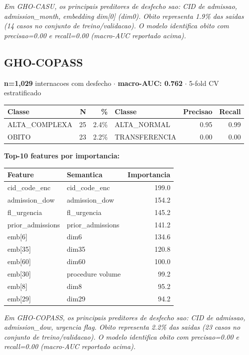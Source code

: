 \documentclass[11pt,a4paper]{article}
\begin{document}
\vspace{4pt}\noindent\textit{Em GHO-CASU, os principais preditores de desfecho sao: CID de admissao, admission\_month, embedding dim[0] (dim0). Obito representa 1.9\% das saidas (14 casos no conjunto de treino/validacao). O modelo identifica obito com precisao=0.00 e recall=0.00 (macro-AUC reportado acima).}

\subsection{GHO-COPASS}
\textbf{n=1,029} internacoes com desfecho $\cdot$ \textbf{macro-AUC: 0.762} $\cdot$ 5-fold CV estratificado

\begin{tabular}{lrr|lrr}
\toprule
Classe & N & \% & Classe & Precisao & Recall \\
\midrule
ALTA\_COMPLEXA & 25 & 2.4\% & ALTA\_NORMAL & 0.95 & 0.99 \\
OBITO & 23 & 2.2\% & TRANSFERENCIA & 0.00 & 0.00 \\
\bottomrule
\end{tabular}

\vspace{4pt}\noindent\textbf{Top-10 features por importancia:}

\begin{tabular}{llr}
\toprule
Feature & Semantica & Importancia \\
\midrule
cid\_code\_enc & cid\_code\_enc & 199.0 \\
admission\_dow & admission\_dow & 154.2 \\
fl\_urgencia & fl\_urgencia & 145.2 \\
prior\_admissions & prior\_admissions & 141.2 \\
emb[6] & dim6 & 134.6 \\
emb[35] & dim35 & 120.8 \\
emb[60] & dim60 & 100.0 \\
emb[30] & procedure volume & 99.2 \\
emb[8] & dim8 & 95.2 \\
emb[29] & dim29 & 94.2 \\
\bottomrule
\end{tabular}

\vspace{4pt}\noindent\textit{Em GHO-COPASS, os principais preditores de desfecho sao: CID de admissao, admission\_dow, urgencia flag. Obito representa 2.2\% das saidas (23 casos no conjunto de treino/validacao). O modelo identifica obito com precisao=0.00 e recall=0.00 (macro-AUC reportado acima).}
\end{document}
